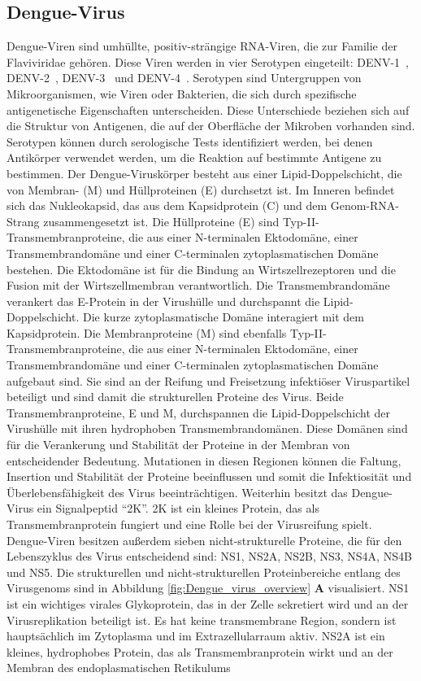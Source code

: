 \documentclass[german,version-2022-01]{uzl-thesis}
\begin{document}
\subsection{Dengue-Virus}
Dengue-Viren sind umh\"ullte, positiv-str\"angige RNA-Viren, die zur Familie der Flaviviridae geh\"oren. Diese Viren werden in vier Serotypen eingeteilt: DENV-1~\cite{tittarelli_dengue_2014}, DENV-2~\cite{cao_retrospective_2023}, DENV-3~\cite{peyrefitte_genetic_2003} und DENV-4~\cite{wardhani_genetic_2023}. Serotypen sind Untergruppen von Mikroorganismen, wie Viren oder Bakterien, die sich durch spezifische antigenetische Eigenschaften unterscheiden. Diese Unterschiede beziehen sich auf die Struktur von Antigenen, die auf der Oberfl\"ache der Mikroben vorhanden sind. Serotypen k\"onnen durch serologische Tests identifiziert werden, bei denen Antik\"orper verwendet werden, um die Reaktion auf bestimmte Antigene zu bestimmen. Der Dengue-Virusk\"orper besteht aus einer Lipid-Doppelschicht, die von Membran- (M) und H\"ullproteinen (E) durchsetzt ist. Im Inneren befindet sich das Nukleokapsid, das aus dem Kapsidprotein (C) und dem Genom-RNA-Strang zusammengesetzt ist. Die H\"ullproteine (E) sind Typ-II-Transmembranproteine, die aus einer N-terminalen Ektodom\"ane, einer Transmembrandom\"ane und einer C-terminalen zytoplasmatischen Dom\"ane bestehen. Die Ektodom\"ane ist f\"ur die Bindung an Wirtszellrezeptoren und die Fusion mit der Wirtszellmembran verantwortlich. Die Transmembrandom\"ane verankert das E-Protein in der Virush\"ulle und durchspannt die Lipid-Doppelschicht. Die kurze zytoplasmatische Dom\"ane interagiert mit dem Kapsidprotein. Die Membranproteine (M) sind ebenfalls Typ-II-Transmembranproteine, die aus einer N-terminalen Ektodom\"ane, einer Transmembrandom\"ane und einer C-terminalen zytoplasmatischen Dom\"ane aufgebaut sind. Sie sind an der Reifung und Freisetzung infekti\"oser Viruspartikel beteiligt und sind damit die strukturellen Proteine des Virus. Beide Transmembranproteine, E und M, durchspannen die Lipid-Doppelschicht der Virush\"ulle mit ihren hydrophoben Transmembrandom\"anen. Diese Dom\"anen sind f\"ur die Verankerung und Stabilit\"at der Proteine in der Membran von entscheidender Bedeutung. Mutationen in diesen Regionen k\"onnen die Faltung, Insertion und Stabilit\"at der Proteine beeinflussen und somit die Infektiosit\"at und \"Uberlebensf\"ahigkeit des Virus beeintr\"achtigen. Weiterhin besitzt das Dengue-Virus ein Signalpeptid "`2K"'. 2K ist ein kleines Protein, das als Transmembranprotein fungiert und eine Rolle bei der Virusreifung spielt. Dengue-Viren besitzen au\ss{}erdem sieben nicht-strukturelle Proteine, die f\"ur den Lebenszyklus des Virus entscheidend sind: NS1, NS2A, NS2B, NS3, NS4A, NS4B und NS5. Die strukturellen und nicht-strukturellen Proteinbereiche entlang des Virusgenoms sind in Abbildung \ref{fig:Dengue_virus_overview} \textbf{A} visualisiert. NS1 ist ein wichtiges virales Glykoprotein, das in der Zelle sekretiert wird und an der Virusreplikation beteiligt ist. Es hat keine transmembrane Region, sondern ist haupts\"achlich im Zytoplasma und im Extrazellularraum aktiv. NS2A ist ein kleines, hydrophobes Protein, das als Transmembranprotein wirkt und an der Membran des endoplasmatischen Retikulums 
\end{document}
